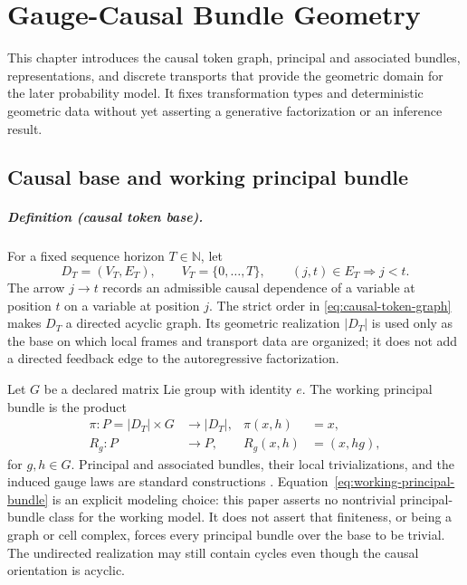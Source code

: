\chapter{Gauge-Causal Bundle Geometry}

This chapter introduces the causal token graph, principal and associated bundles, representations, and discrete transports that provide the geometric domain for the later probability model. It fixes transformation types and deterministic geometric data without yet asserting a generative factorization or an inference result.

\section{Causal base and working principal bundle}

\paragraph{Definition (causal token base).}
For a fixed sequence horizon $T\in\mathbb N$, let
\begin{equation}
D_T=(V_T,E_T),
\qquad
V_T=\{0,\ldots,T\},
\qquad
(j,t)\in E_T\Longrightarrow j<t.
\label{eq:causal-token-graph}
\end{equation}
The arrow $j\to t$ records an admissible causal dependence of a variable at position $t$ on a variable at position $j$.  The strict order in \cref{eq:causal-token-graph} makes $D_T$ a directed acyclic graph.  Its geometric realization $|D_T|$ is used only as the base on which local frames and transport data are organized; it does not add a directed feedback edge to the autoregressive factorization.

Let $G$ be a declared matrix Lie group with identity $e$.  The working principal bundle is the product
\begin{equation}
\begin{aligned}
\pi:P=|D_T|\times G&\longrightarrow |D_T|,
&\pi(x,h)&=x,\\
R_g:P&\longrightarrow P,
&R_g(x,h)&=(x,hg),
\end{aligned}
\label{eq:working-principal-bundle}
\end{equation}
for $g,h\in G$.  Principal and associated bundles, their local trivializations, and the induced gauge laws are standard constructions \citep{kobayashi1963foundations,nakahara2003geometry}.  Equation~\eqref{eq:working-principal-bundle} is an explicit modeling choice: this paper asserts no nontrivial principal-bundle class for the working model.  It does not assert that finiteness, or being a graph or cell complex, forces every principal bundle over the base to be trivial.  The undirected realization may still contain cycles even though the causal orientation is acyclic.

